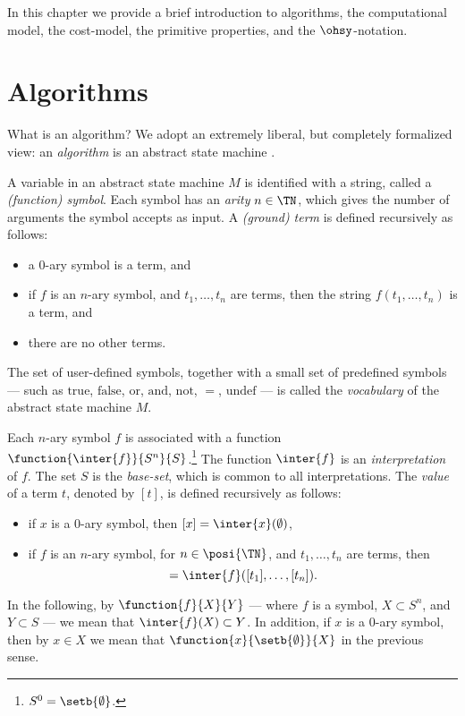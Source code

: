 \documentclass[b5paper, english, oneside]{memoir}
\begin{document}
In this chapter we provide a brief introduction to algorithms, the computational model, the cost-model, the primitive properties, and the $\ohsy$-notation.

\section{Algorithms}
\label{Algorithms}

What is an algorithm? We adopt an extremely liberal, but completely formalized view: an \emph{algorithm} is an abstract state machine \cite{SequentialAsm, ParallelAsm, ASMBook}. 

A variable in an abstract state machine $M$ is identified with a string, called a \emph{(function) symbol}. Each symbol has an \emph{arity} $n \in \TN$, which gives the number of arguments the symbol accepts as input. A \emph{(ground) term} is defined recursively as follows:
\begin{itemize}
\item a $0$-ary symbol is a term, and
\item if $f$ is an $n$-ary symbol, and $t_1, \dots, t_n$ are terms, then the string $f(t_1, \dots, t_n)$ is a term, and
\item there are no other terms.
\end{itemize}
The set of user-defined symbols, together with a small set of predefined symbols --- such as $\textrm{true}$, $\textrm{false}$, $\textrm{or}$, $\textrm{and}$, $\textrm{not}$, $=$, $\textrm{undef}$ --- is called the \emph{vocabulary} of the abstract state machine $M$.

Each $n$-ary symbol $f$ is associated with a function $\function{\inter{f}}{S^n}{S}$.\footnote{$S^0 = \setb{\emptyset}$.} The function $\inter{f}$ is an \emph{interpretation} of $f$. The set $S$ is the \emph{base-set}, which is common to all interpretations. The \emph{value} of a term $t$, denoted by $[t]$, is defined recursively as follows:
\begin{itemize}
\item if $x$ is a $0$-ary symbol, then $[x] = \inter{x}(\emptyset)$,
\item if $f$ is an $n$-ary symbol, for $n \in \posi{\TN}$, and $t_1, \dots, t_n$ are terms, then
\begin{equation*}
[f(t_1, \dots, t_n)] = \inter{f}([t_1], \dots, [t_n]).
\end{equation*}
\end{itemize}
In the following, by $\function{f}{X}{Y}$ --- where $f$ is a symbol, $X \subset S^n$, and $Y \subset S$ --- we mean that $\inter{f}(X) \subset Y$. In addition, if $x$ is a $0$-ary symbol, then by $x \in X$ we mean that $\function{x}{\setb{\emptyset}}{X}$ in the previous sense.
\end{document}
